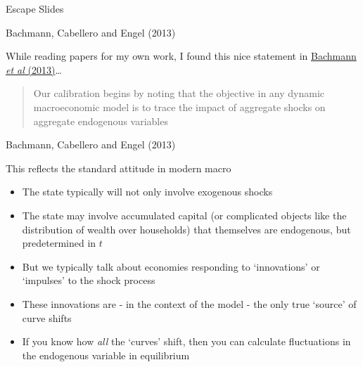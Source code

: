 \begin{frame}

\begin{center}
{\LARGE Escape Slides}
\end{center}

\end{frame}



\begin{frame}[label=bachmann]{Bachmann, Cabellero and Engel (2013)}

While reading papers for my own work, I found this nice statement in \href{https://www.aeaweb.org/articles?id=10.1257/mac.5.4.29}{Bachmann \textit{et al} (2013)}\ldots

\vspace{5mm}
\begin{quote}
Our calibration begins by noting that the objective in any dynamic macroeconomic model is to trace the impact of aggregate shocks on aggregate endogenous variables
\end{quote}

\end{frame}



\begin{frame}{Bachmann, Cabellero and Engel (2013)}

This reflects the standard attitude in modern macro
\begin{itemize}
\item	The state typically will not only involve exogenous shocks
\item	The state may involve accumulated capital (or complicated objects like the distribution of wealth over households) that themselves are endogenous, but predetermined in $t$
\item	But we typically talk about economies responding to `innovations' or `impulses' to the shock process
\item	These innovations are - in the context of the model - the only true `source' of curve shifts
\item	If you know how \textit{all} the `curves' shift, then you can calculate fluctuations in the endogenous variable in equilibrium
\end{itemize}

\end{frame}

